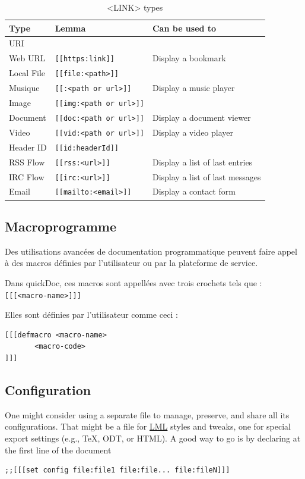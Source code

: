 \documentclass[a4paper,12pt]{article}
\begin{document}
\begin{table}[htbp]
\caption{<LINK> types}
\centering
\begin{tabular}{lll}
\hline
Type & Lemma & Can be used to\\
\hline
URI &  & \\
Web URL & \texttt{[[https:link]]} & Display a bookmark\\
Local File & \texttt{[[file:<path>]]} & \\
Musique & \texttt{[[:<path or url>]]} & Display a music player\\
Image & \texttt{[[img:<path or url>]]} & \\
Document & \texttt{[[doc:<path or url>]]} & Display a document viewer\\
Video & \texttt{[[vid:<path or url>]]} & Display a video player\\
Header ID & \texttt{[[id:headerId]]} & \\
RSS Flow & \texttt{[[rss:<url>]]} & Display a list of last entries\\
IRC Flow & \texttt{[[irc:<url>]]} & Display a list of last messages\\
Email & \texttt{[[mailto:<email>]]} & Display a contact form\\
\hline
\end{tabular}
\end{table}
\subsection{Macroprogramme}
\label{sec:orga74100d}
Des utilisations avancées de documentation programmatique peuvent faire appel à des macros définies par l'utilisateur ou par la plateforme de service.

Dans quickDoc, ces macros sont appellées avec trois crochets tels que : \texttt{[[[<macro-name>]]]}

Elles sont définies par l'utilisateur comme ceci :
\begin{verbatim}
[[[defmacro <macro-name>
       <macro-code>
]]]
\end{verbatim}
\subsection{Configuration}
\label{sec:org562ce93}
One might consider using a separate file to manage, preserve, and share all its configurations.
That might be a file for \protect\hyperlink{gls-1}{\label{gls-1-use-5}LML} styles and tweaks, one for special export settings (e.g., \TeX{}, ODT, or HTML).
A good way to go is by declaring at the first line of the document 
\begin{verbatim}
;;[[[set config file:file1 file:file... file:fileN]]]
\end{verbatim}
\end{document}
